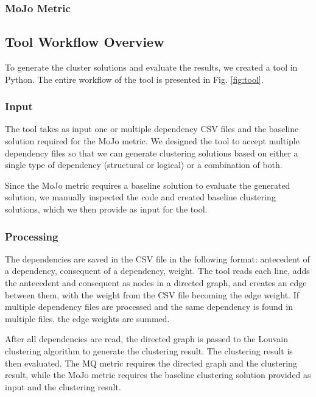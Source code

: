 \documentclass{ieeeaccess}
\begin{document}
\subsubsection{MoJo Metric}

\subsection{Tool Workflow Overview}
\label{subsec:tool_workflow}

To generate the cluster solutions and evaluate the results, we created a tool in Python. The entire workflow of the tool is presented in Fig. \ref{fig:tool}.

\subsubsection{Input}

The tool takes as input one or multiple dependency CSV files and the baseline solution required for the MoJo metric. We designed the tool to accept multiple dependency files so that we can generate clustering solutions based on either a single type of dependency (structural or logical) or a combination of both.

Since the MoJo metric requires a baseline solution to evaluate the generated solution, we manually inspected the code and created baseline clustering solutions, which we then provide as input for the tool.

\subsubsection{Processing}

The dependencies are saved in the CSV file in the following format: antecedent of a dependency, consequent of a dependency, weight. The tool reads each line, adds the antecedent and consequent as nodes in a directed graph, and creates an edge between them, with the weight from the CSV file becoming the edge weight. If multiple dependency files are processed and the same dependency is found in multiple files, the edge weights are summed.


After all dependencies are read, the directed graph is passed to the Louvain clustering algorithm to generate the clustering result. The clustering result is then evaluated. The MQ metric requires the directed graph and the clustering result, while the MoJo metric requires the baseline clustering solution provided as input and the clustering result.
\end{document}
